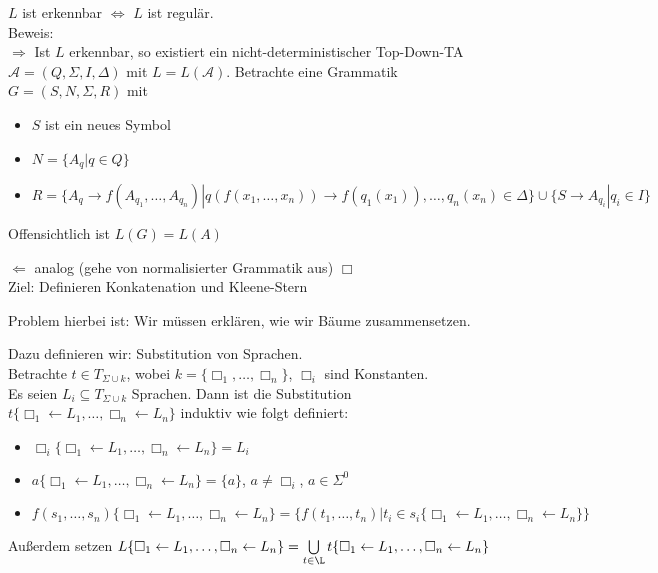 \documentclass[titlepage]{article}
\begin{document}
$L$ ist erkennbar $\Leftrightarrow$ $L$ ist regul\"ar.\\

Beweis:\\
\glqq $\Rightarrow$ \grqq
Ist $L$ erkennbar, so existiert ein nicht-deterministischer Top-Down-TA 
$\mathcal{A} = (Q, \Sigma, I, \Delta)$ mit $L = L(\mathcal{A})$.
Betrachte eine Grammatik $G = (S, N, \Sigma, R)$ mit
\begin{itemize}
	\item $S$ ist ein neues Symbol
	\item $N = \{ A_q | q \in Q\}$
	\item $R = \{ A_q \to f(A_{q_1}, \dots, A_{q_n}) | 
		q(f(x_1, \dots, x_n)) \to f(q_1(x_1)), \dots, q_n(x_n) \in \Delta \} \cup 
		\{ S \to A_{q_i} | q_i \in I \}$
\end{itemize}

Offensichtlich ist $L(G) = L(A)$

\glqq $\Leftarrow$ \grqq analog (gehe von normalisierter Grammatik aus) $\Box$\\

Ziel: Definieren Konkatenation und Kleene-Stern

Problem hierbei ist: Wir m\"ussen erkl\"aren, wie wir B\"aume zusammensetzen.

Dazu definieren wir: Substitution von Sprachen.\\

Betrachte $t \in T_{\Sigma \cup k}$, wobei $k = \{\Box_1, \dots, \Box_n\}$, 
$\Box_i$ sind Konstanten.\\
Es seien $L_i \subseteq T_{\Sigma \cup k}$ Sprachen. Dann ist die Substitution
$t\{ \Box_1 \leftarrow L_1, \dots, \Box_n \leftarrow L_n \}$ induktiv wie folgt definiert:
\begin{itemize}
	\item $\Box_i\{ \Box_1 \leftarrow L_1, \dots, \Box_n \leftarrow L_n \} = L_i$
	\item $a\{ \Box_1 \leftarrow L_1, \dots, \Box_n \leftarrow L_n \} = \{a\}$, $a \neq \Box_i$, $a \in \Sigma^0$
	\item $f(s_1, \dots, s_n)\{ \Box_1 \leftarrow L_1, \dots, \Box_n \leftarrow L_n \} = 
		\{f(t_1, \dots, t_n) | t_i \in s_i\{ \Box_1 \leftarrow L_1, \dots, \Box_n \leftarrow L_n \} \}$
\end{itemize}

Au\ss erdem setzen $L\{ \Box_1 \leftarrow L_1, \dots, \Box_n \leftarrow L_n \} = 
\bigcup\limits_{t \in \L} t\{ \Box_1 \leftarrow L_1, \dots, \Box_n \leftarrow L_n \}$
\end{document}
